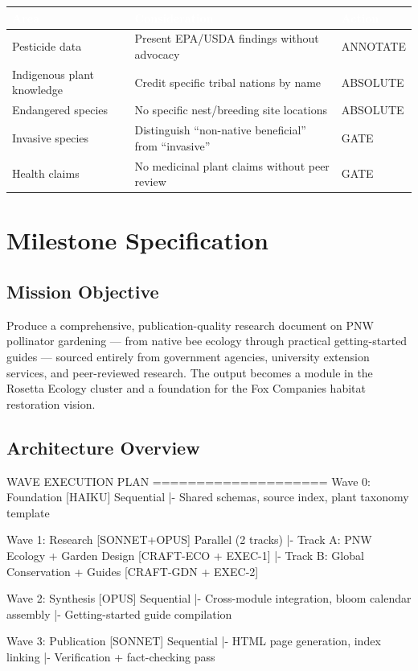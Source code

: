 \documentclass[11pt,letterpaper]{article}
\newcommand{\stageheader}[2]{%
  \noindent\colorbox{#2}{\makebox[\textwidth][l]{%
    \textcolor{white}{\bfseries\sffamily\hspace{6pt}#1\hspace{6pt}}}}%
  \vspace{0.5em}\par%
}
\newcommand{\tableheader}[1]{\textbf{\sffamily\textcolor{white}{#1}}}
\begin{document}
\begin{center}
\begin{tabularx}{\textwidth}{L{3cm}XL{2cm}}
\toprule
{}
\tableheader{Area} & \tableheader{Consideration} & \tableheader{Action} \\
\midrule
Pesticide data & Present EPA/USDA findings without advocacy & ANNOTATE \\
Indigenous plant knowledge & Credit specific tribal nations by name & ABSOLUTE \\
Endangered species & No specific nest/breeding site locations & ABSOLUTE \\
Invasive species & Distinguish ``non-native beneficial'' from ``invasive'' & GATE \\
Health claims & No medicinal plant claims without peer review & GATE \\
\bottomrule
\end{tabularx}
\end{center}

\newpage

\stageheader{STAGE 3 --- MISSION PACKAGE}{tertiary}

\section{Milestone Specification}

\subsection{Mission Objective}

Produce a comprehensive, publication-quality research document on PNW pollinator gardening --- from native bee ecology through practical getting-started guides --- sourced entirely from government agencies, university extension services, and peer-reviewed research. The output becomes a module in the Rosetta Ecology cluster and a foundation for the Fox Companies habitat restoration vision.

\subsection{Architecture Overview}

\begin{asciibox}
WAVE EXECUTION PLAN
====================
Wave 0: Foundation     [HAIKU]     Sequential
  |- Shared schemas, source index, plant taxonomy template

Wave 1: Research       [SONNET+OPUS]  Parallel (2 tracks)
  |- Track A: PNW Ecology + Garden Design    [CRAFT-ECO + EXEC-1]
  |- Track B: Global Conservation + Guides   [CRAFT-GDN + EXEC-2]

Wave 2: Synthesis      [OPUS]      Sequential
  |- Cross-module integration, bloom calendar assembly
  |- Getting-started guide compilation

Wave 3: Publication    [SONNET]    Sequential
  |- HTML page generation, index linking
  |- Verification + fact-checking pass
\end{asciibox}
\end{document}
